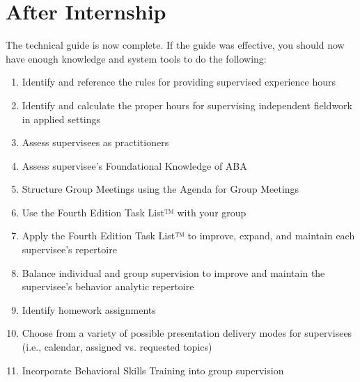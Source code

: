 \chapter{After Internship}
The technical guide is now complete. If the guide was effective, you should now have enough knowledge and system tools to do the following:
\begin{enumerate}
\item Identify and reference the rules for providing supervised experience hours
\item Identify and calculate the proper hours for supervising independent fieldwork in applied settings
\item Assess supervisees as practitioners
\item Assess supervisee's Foundational Knowledge of ABA
\item Structure Group Meetings using the Agenda for Group Meetings
\item Use the Fourth Edition Task List™ with your group
\item Apply the Fourth Edition Task List™ to improve, expand, and maintain each supervisee's repertoire
\item Balance individual and group supervision to improve and maintain the supervisee's behavior analytic repertoire
\item Identify homework assignments
\item Choose from a variety of possible presentation delivery modes for supervisees (i.e., calendar, assigned vs. requested topics)
\item Incorporate Behavioral Skills Training into group supervision
\end{enumerate}
%
%
